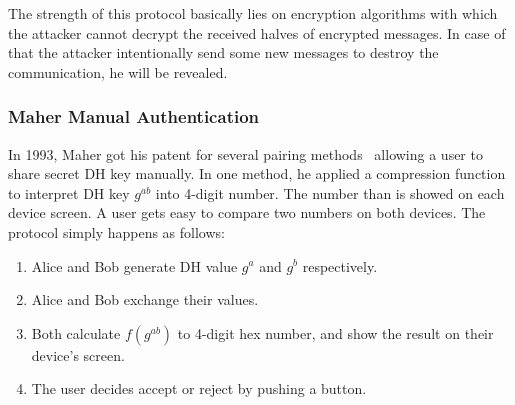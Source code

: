 \begin{center}
\end{center}

The strength of this protocol basically lies on encryption algorithms with which the attacker cannot decrypt the received halves of encrypted messages. In case of that the attacker intentionally send some new messages to destroy the communication, he will be revealed. 

\subsubsection{Maher Manual Authentication}

In 1993, Maher got his patent for several pairing methods~\cite{maher} allowing a user to share secret DH key manually. In one method, he applied a compression function to interpret DH key $g^{ab}$ into 4-digit number. The number than is showed on each device screen. A user gets easy to compare two numbers on both devices. The protocol simply happens as follows: 
\begin{enumerate}
\item Alice and Bob generate DH value $g^a$ and $g^b$ respectively. 
\item Alice and Bob exchange their values. 
\item Both calculate $f(g^{ab})$ to 4-digit hex number, and show the result on their device's screen. 
\item The user decides accept or reject by pushing a button. 
\end{enumerate}

